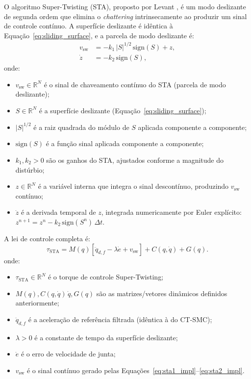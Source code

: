 O algoritmo Super-Twisting (STA), proposto por Levant \cite{levant1993sliding}, é um modo deslizante de segunda ordem que elimina o \textit{chattering} intrinsecamente ao produzir um sinal de controle contínuo. A superfície deslizante é idêntica à Equação~\eqref{eq:sliding_surface}, e a parcela de modo deslizante é:
\begin{align}
    v_{\text{sw}} &= -k_1\,|S|^{1/2}\,\text{sign}(S) + z, \label{eq:sta1_impl}\\
    \dot{z} &= -k_2\,\text{sign}(S), \label{eq:sta2_impl}
\end{align}
onde:
\begin{itemize}
    \item $v_{\text{sw}} \in \mathbb{R}^N$ é o sinal de chaveamento contínuo do STA (parcela de modo deslizante);
    \item $S \in \mathbb{R}^N$ é a superfície deslizante (Equação~\eqref{eq:sliding_surface});
    \item $|S|^{1/2}$ é a raiz quadrada do módulo de $S$ aplicada componente a componente;
    \item $\text{sign}(S)$ é a função sinal aplicada componente a componente;
    \item $k_1, k_2 > 0$ são os ganhos do STA, ajustados conforme a magnitude do distúrbio;
    \item $z \in \mathbb{R}^N$ é a variável interna que integra o sinal descontínuo, produzindo $v_{\text{sw}}$ contínuo;
    \item $\dot{z}$ é a derivada temporal de $z$, integrada numericamente por Euler explícito: $z^{n+1} = z^n - k_2\,\text{sign}(S^n)\,\Delta t$.
\end{itemize}

A lei de controle completa é:
\begin{equation}
    \tau_{\text{STA}} = M(q)\left[\ddot{q}_{d,f} - \lambda\dot{e} + v_{\text{sw}}\right] + C(q,\dot{q}) + G(q).
    \label{eq:sta_ctrl}
\end{equation}
onde:
\begin{itemize}
    \item $\tau_{\text{STA}} \in \mathbb{R}^N$ é o torque de controle Super-Twisting;
    \item $M(q), C(q,\dot{q})\,\dot{q}, G(q)$ são as matrizes/vetores dinâmicos definidos anteriormente;
    \item $\ddot{q}_{d,f}$ é a aceleração de referência filtrada (idêntica à do CT-SMC);
    \item $\lambda > 0$ é a constante de tempo da superfície deslizante;
    \item $\dot{e}$ é o erro de velocidade de junta;
    \item $v_{\text{sw}}$ é o sinal contínuo gerado pelas Equações~\eqref{eq:sta1_impl}--\eqref{eq:sta2_impl}.
\end{itemize}

